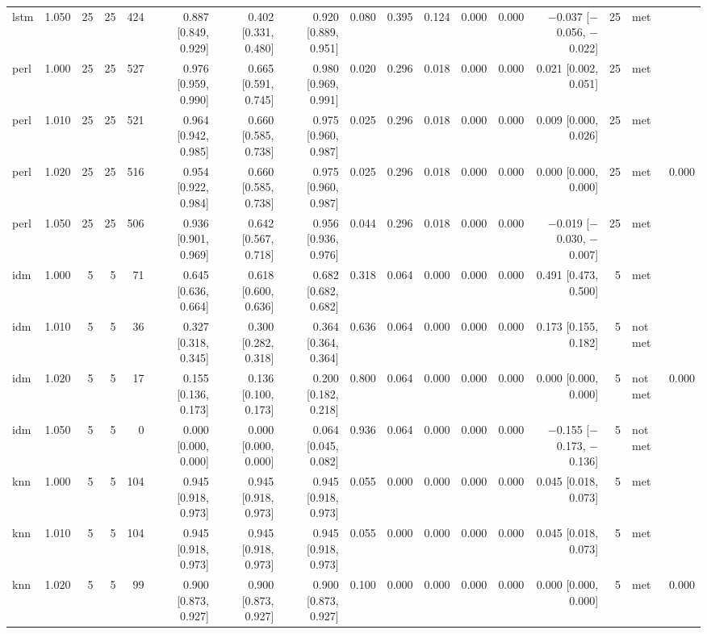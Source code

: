 \begin{table}[htbp]
{\begin{tabular}{lrrrrrrrrrrrrrrlr}
lstm & 1.050 & 25 & 25 & 424 & 0.887 [0.849, 0.929] & 0.402 [0.331, 0.480] & 0.920 [0.889, 0.951] & 0.080 & 0.395 & 0.124 & 0.000 & 0.000 & $-$0.037 [$-$0.056, $-$0.022] & 25 & met &  \\
perl & 1.000 & 25 & 25 & 527 & 0.976 [0.959, 0.990] & 0.665 [0.591, 0.745] & 0.980 [0.969, 0.991] & 0.020 & 0.296 & 0.018 & 0.000 & 0.000 & 0.021 [0.002, 0.051] & 25 & met &  \\
perl & 1.010 & 25 & 25 & 521 & 0.964 [0.942, 0.985] & 0.660 [0.585, 0.738] & 0.975 [0.960, 0.987] & 0.025 & 0.296 & 0.018 & 0.000 & 0.000 & 0.009 [0.000, 0.026] & 25 & met &  \\
perl & 1.020 & 25 & 25 & 516 & 0.954 [0.922, 0.984] & 0.660 [0.585, 0.738] & 0.975 [0.960, 0.987] & 0.025 & 0.296 & 0.018 & 0.000 & 0.000 & 0.000 [0.000, 0.000] & 25 & met & 0.000 \\
perl & 1.050 & 25 & 25 & 506 & 0.936 [0.901, 0.969] & 0.642 [0.567, 0.718] & 0.956 [0.936, 0.976] & 0.044 & 0.296 & 0.018 & 0.000 & 0.000 & $-$0.019 [$-$0.030, $-$0.007] & 25 & met &  \\
idm & 1.000 & 5 & 5 & 71 & 0.645 [0.636, 0.664] & 0.618 [0.600, 0.636] & 0.682 [0.682, 0.682] & 0.318 & 0.064 & 0.000 & 0.000 & 0.000 & 0.491 [0.473, 0.500] & 5 & met &  \\
idm & 1.010 & 5 & 5 & 36 & 0.327 [0.318, 0.345] & 0.300 [0.282, 0.318] & 0.364 [0.364, 0.364] & 0.636 & 0.064 & 0.000 & 0.000 & 0.000 & 0.173 [0.155, 0.182] & 5 & not met &  \\
idm & 1.020 & 5 & 5 & 17 & 0.155 [0.136, 0.173] & 0.136 [0.100, 0.173] & 0.200 [0.182, 0.218] & 0.800 & 0.064 & 0.000 & 0.000 & 0.000 & 0.000 [0.000, 0.000] & 5 & not met & 0.000 \\
idm & 1.050 & 5 & 5 & 0 & 0.000 [0.000, 0.000] & 0.000 [0.000, 0.000] & 0.064 [0.045, 0.082] & 0.936 & 0.064 & 0.000 & 0.000 & 0.000 & $-$0.155 [$-$0.173, $-$0.136] & 5 & not met &  \\
knn & 1.000 & 5 & 5 & 104 & 0.945 [0.918, 0.973] & 0.945 [0.918, 0.973] & 0.945 [0.918, 0.973] & 0.055 & 0.000 & 0.000 & 0.000 & 0.000 & 0.045 [0.018, 0.073] & 5 & met &  \\
knn & 1.010 & 5 & 5 & 104 & 0.945 [0.918, 0.973] & 0.945 [0.918, 0.973] & 0.945 [0.918, 0.973] & 0.055 & 0.000 & 0.000 & 0.000 & 0.000 & 0.045 [0.018, 0.073] & 5 & met &  \\
knn & 1.020 & 5 & 5 & 99 & 0.900 [0.873, 0.927] & 0.900 [0.873, 0.927] & 0.900 [0.873, 0.927] & 0.100 & 0.000 & 0.000 & 0.000 & 0.000 & 0.000 [0.000, 0.000] & 5 & met & 0.000 \\

\end{tabular}}
\end{table}
